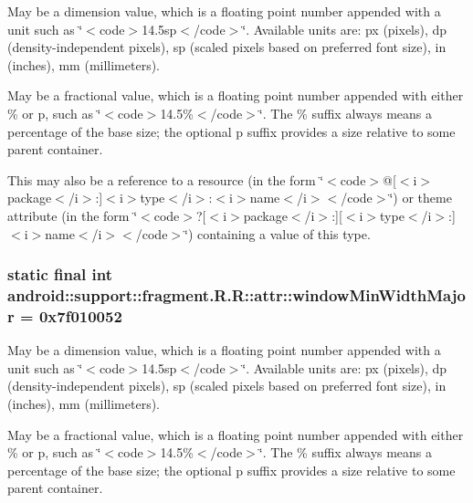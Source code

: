 May be a dimension value, which is a floating point number appended with a unit such as \char`\"{}$<$code$>$14.5sp$<$/code$>$\char`\"{}. Available units are: px (pixels), dp (density-independent pixels), sp (scaled pixels based on preferred font size), in (inches), mm (millimeters). 

May be a fractional value, which is a floating point number appended with either \% or p, such as \char`\"{}$<$code$>$14.5\%$<$/code$>$\char`\"{}. The \% suffix always means a percentage of the base size; the optional p suffix provides a size relative to some parent container. 

This may also be a reference to a resource (in the form \char`\"{}$<$code$>$@\mbox{[}$<$i$>$package$<$/i$>$:\mbox{]}$<$i$>$type$<$/i$>$:$<$i$>$name$<$/i$>$$<$/code$>$\char`\"{}) or theme attribute (in the form \char`\"{}$<$code$>$?\mbox{[}$<$i$>$package$<$/i$>$:\mbox{]}\mbox{[}$<$i$>$type$<$/i$>$:\mbox{]}$<$i$>$name$<$/i$>$$<$/code$>$\char`\"{}) containing a value of this type. \hypertarget{classandroid_1_1support_1_1fragment_1_1_r_1_1attr_d1b81253843a5fb82050ccb42329460e}{
\subsubsection[{windowMinWidthMajor}]{\setlength{\rightskip}{0pt plus 5cm}static final int android::support::fragment.R.R::attr::windowMinWidthMajor = 0x7f010052}}
\label{classandroid_1_1support_1_1fragment_1_1_r_1_1attr_d1b81253843a5fb82050ccb42329460e}


May be a dimension value, which is a floating point number appended with a unit such as \char`\"{}$<$code$>$14.5sp$<$/code$>$\char`\"{}. Available units are: px (pixels), dp (density-independent pixels), sp (scaled pixels based on preferred font size), in (inches), mm (millimeters). 

May be a fractional value, which is a floating point number appended with either \% or p, such as \char`\"{}$<$code$>$14.5\%$<$/code$>$\char`\"{}. The \% suffix always means a percentage of the base size; the optional p suffix provides a size relative to some parent container. 

